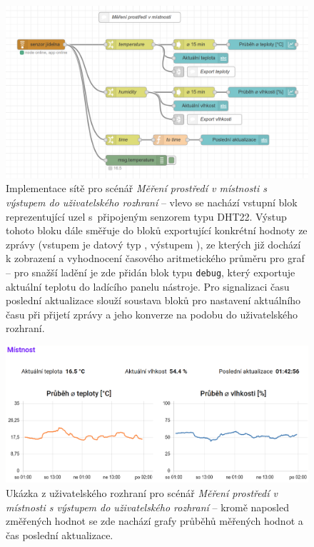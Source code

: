 \begin{figure}
    \centering
    \includegraphics[width=\textwidth]{figures/fis-flow-1.png}
    \caption{Implementace sítě pro scénář  \textit{Měření prostředí v místnosti s výstupem do uživatelského
    rozhraní} -- vlevo se nachází vstupní blok reprezentující uzel s~připojeným senzorem typu DHT22.
    Výstup tohoto bloku dále směřuje do bloků exportující konkrétní hodnoty ze zprávy (vstupem je datový typ
    , výstupem ), ze kterých již dochází k zobrazení a vyhodnocení časového aritmetického
    průměru pro graf -- pro snažší ladění je zde přidán blok typu \texttt{debug}, který exportuje aktuální teplotu
    do ladícího panelu nástroje.
    Pro signalizaci času poslední aktualizace slouží soustava bloků pro nastavení aktuálního času při přijetí zprávy
    a jeho konverze na podobu do uživatelského rozhraní.}
    \label{fig:node-red-production-1}
\end{figure}
\begin{figure}
    \centering
    \includegraphics[width=\textwidth]{figures/fis-flow-1-ui.png}
    \caption{Ukázka z uživatelského rozhraní pro scénář \textit{Měření prostředí v místnosti s výstupem do
    uživatelského rozhraní} -- kromě naposled změřených hodnot se zde nachází grafy průběhů měřených hodnot a čas
    poslední aktualizace.}
    \label{fig:node-red-production-1-ui}
\end{figure}

